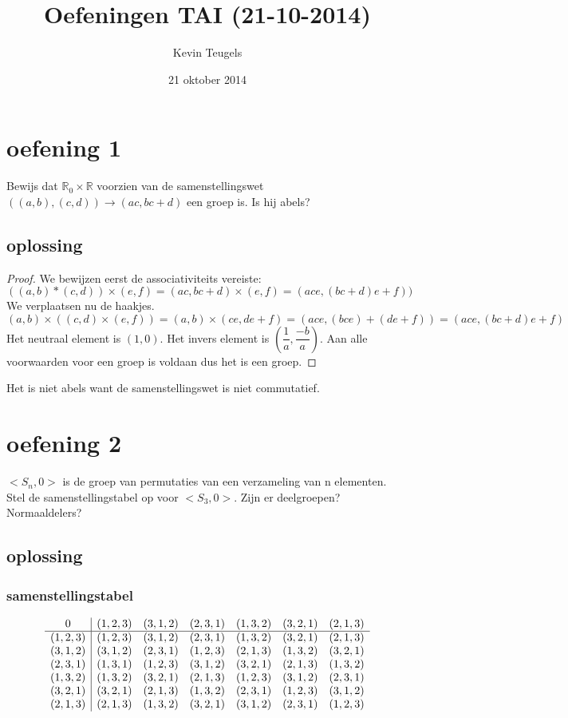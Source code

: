 \documentclass[12pt,a4paper]{article}
\author{Kevin Teugels}
\title{Oefeningen TAI (21-10-2014)}
\date{21 oktober 2014}
\begin{document}
\maketitle
\section*{oefening 1}

Bewijs dat $\mathbb{R}_0 \times \mathbb{R} $ voorzien van de samenstellingswet $((a,b),(c,d)) \rightarrow (ac,bc+d)$ een groep is. Is hij abels?
\subsection*{oplossing}
\begin{proof} 
We bewijzen eerst de associativiteits vereiste:
\[
((a,b)*(c,d))\times (e,f)=(ac,bc+d)\times (e,f)=(ace,(bc+d)e+f))
\]
We verplaatsen nu de haakjes.
\[
(a,b) \times ((c,d) \times (e,f))=(a,b) \times (ce,de+f)=(ace,(bce)+(de+f))=(ace,(bc+d)e+f)
\]
Het neutraal element is $(1,0)$.
Het invers element is $(\dfrac{1}{a},\dfrac{-b}{a})$.
Aan alle voorwaarden voor een groep is voldaan dus het is een groep.
\end{proof}
Het is niet abels want de samenstellingswet is niet commutatief.
\section*{oefening 2}

$<S_n,0>$ is de groep van permutaties van een verzameling van n elementen. Stel de samenstellingstabel op voor $<S_3,0>$. Zijn er deelgroepen? Normaaldelers?
\subsection*{oplossing}
\subsubsection*{samenstellingstabel}
\[
\begin{array}{c| c c c c c c }
0 & (1,2,3) &(3,1,2) & (2,3,1) & (1,3,2) & (3,2,1)& (2,1,3)\\
\hline
(1,2,3) &(1,2,3) &(3,1,2) & (2,3,1) & (1,3,2) &(3,2,1) &(2,1,3)\\
(3,1,2)& (3,1,2) & (2,3,1) & (1,2,3) &(2,1,3) & (1,3,2) & (3,2,1)\\
(2,3,1) & (1,3,1) & (1,2,3) & (3,1,2) & (3,2,1) & (2,1,3)&(1,3,2)\\
(1,3,2) & (1,3,2) & (3,2,1) & (2,1,3) &(1,2,3) & (3,1,2)&(2,3,1)\\
(3,2,1) & (3,2,1) & (2,1,3) & (1,3,2) & (2,3,1) &(1,2,3) & (3,1,2)\\
(2,1,3) & (2,1,3) & (1,3,2) & (3,2,1) & (3,1,2) & (2,3,1) & (1,2,3)\\
\end{array}
\]
\end{document}
